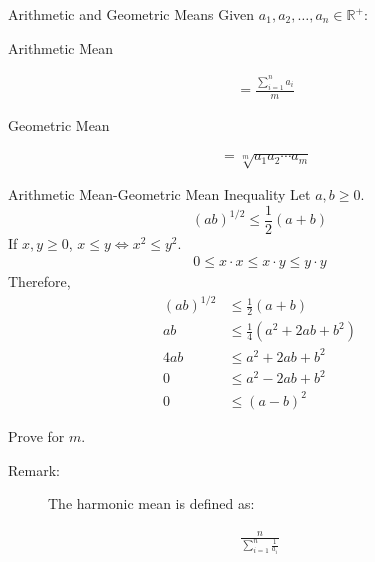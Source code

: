 \documentclass[10pt]{extarticle}
\newcommand{\R}{\mathbb{R}}
\begin{document}
  \begin{problem}{Arithmetic and Geometric Means}
    Given $a_1,a_2,\dots,a_n\in \R^+$:
    \begin{description}
      \item[Arithmetic Mean]
    \end{description}
    \begin{align*}
      &= \frac{\sum_{i =1}^{n} a_i}{m}
    \end{align*}
    \begin{description}
      \item[Geometric Mean]
    \end{description}
    \begin{align*}
      &= \sqrt[m]{a_1a_2\cdots a_m}
    \end{align*}
    \begin{problem}{Arithmetic Mean-Geometric Mean Inequality}
      Let $a,b \geq 0$.
      \[
        (ab)^{1/2} \leq \frac{1}{2}(a+b)
      \] 
      \tcblower
      If $x,y \geq 0$, $x\leq y \Leftrightarrow x^2 \leq y^2$.
      \begin{align*}
          0 \leq x\cdot x \leq x \cdot y \leq y\cdot y\tag*{by property (ii) of ordered fields}
      \end{align*}
      Therefore,  
      \begin{align*}
        (ab)^{1/2}&\leq \frac{1}{2}(a+b)\\
        ab &\leq \frac{1}{4}(a^2 + 2ab + b^2)\\
        4ab &\leq a^2 + 2ab + b^2 \\
        0 &\leq a^2 - 2ab + b^2\\
        0 &\leq (a-b)^2 \tag*{by definition}
      \end{align*}
      \begin{description}
        \small
        \item[Challenge:] Prove for $m$.
      \end{description}
    \end{problem}
    \begin{description}
      \item[Remark:] The harmonic mean is defined as:
    \end{description}
    \begin{align*}
      \frac{n}{\displaystyle\sum_{i=1}^{n}\frac{1}{a_i}}
    \end{align*}
  \end{problem}
\end{document}
